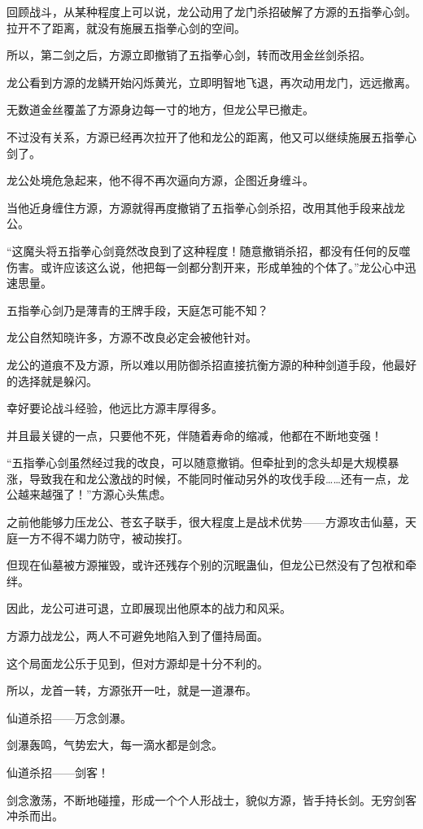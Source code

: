 \begin{this_body}
回顾战斗，从某种程度上可以说，龙公动用了龙门杀招破解了方源的五指拳心剑。拉开不了距离，就没有施展五指拳心剑的空间。

所以，第二剑之后，方源立即撤销了五指拳心剑，转而改用金丝剑杀招。

龙公看到方源的龙鳞开始闪烁黄光，立即明智地飞退，再次动用龙门，远远撤离。

无数道金丝覆盖了方源身边每一寸的地方，但龙公早已撤走。

不过没有关系，方源已经再次拉开了他和龙公的距离，他又可以继续施展五指拳心剑了。

龙公处境危急起来，他不得不再次逼向方源，企图近身缠斗。

当他近身缠住方源，方源就得再度撤销了五指拳心剑杀招，改用其他手段来战龙公。

“这魔头将五指拳心剑竟然改良到了这种程度！随意撤销杀招，都没有任何的反噬伤害。或许应该这么说，他把每一剑都分割开来，形成单独的个体了。”龙公心中迅速思量。

五指拳心剑乃是薄青的王牌手段，天庭怎可能不知？

龙公自然知晓许多，方源不改良必定会被他针对。

龙公的道痕不及方源，所以难以用防御杀招直接抗衡方源的种种剑道手段，他最好的选择就是躲闪。

幸好要论战斗经验，他远比方源丰厚得多。

并且最关键的一点，只要他不死，伴随着寿命的缩减，他都在不断地变强！

“五指拳心剑虽然经过我的改良，可以随意撤销。但牵扯到的念头却是大规模暴涨，导致我在和龙公激战的时候，不能同时催动另外的攻伐手段……还有一点，龙公越来越强了！”方源心头焦虑。

之前他能够力压龙公、苍玄子联手，很大程度上是战术优势——方源攻击仙墓，天庭一方不得不竭力防守，被动挨打。

但现在仙墓被方源摧毁，或许还残存个别的沉眠蛊仙，但龙公已然没有了包袱和牵绊。

因此，龙公可进可退，立即展现出他原本的战力和风采。

方源力战龙公，两人不可避免地陷入到了僵持局面。

这个局面龙公乐于见到，但对方源却是十分不利的。

所以，龙首一转，方源张开一吐，就是一道瀑布。

仙道杀招——万念剑瀑。

剑瀑轰鸣，气势宏大，每一滴水都是剑念。

仙道杀招——剑客！

剑念激荡，不断地碰撞，形成一个个人形战士，貌似方源，皆手持长剑。无穷剑客冲杀而出。


\end{this_body}
